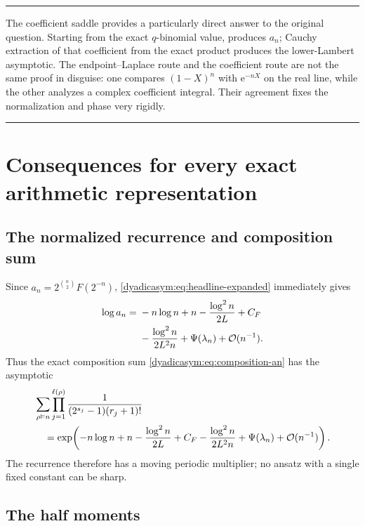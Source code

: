 \documentclass[11pt,oneside]{article}
\theoremstyle{definition}
\theoremstyle{remark}
\newcommand{\e}{\mathrm e}
\newcommand{\bigO}{\mathcal O}
\newenvironment{boxedremark}{%
  \par\smallskip\noindent\begin{center}\begin{minipage}{0.94\textwidth}%
  \color{black}\hrule\vspace{0.6em}\small
}{%
  \vspace{0.6em}\hrule\end{minipage}\end{center}\smallskip
}
\begin{document}
\begin{boxedremark}
The coefficient saddle provides a particularly direct answer to the original question.
Starting from the exact $q$-binomial value,  produces $a_n$; Cauchy
extraction of that coefficient from the exact product produces the lower-Lambert asymptotic.
The endpoint--Laplace route and the coefficient route are not the same proof in disguise:
one compares $(1-X)^n$ with $\e^{-nX}$ on the real line, while the other analyzes a complex
coefficient integral.  Their agreement fixes the normalization and phase very rigidly.
\end{boxedremark}

\section{Consequences for every exact arithmetic representation}
\label{dyadicasym:sec:corollaries}

\subsection{The normalized recurrence and composition sum}

Since $a_n=2^{\binom n2}F(2^{-n})$, \eqref{dyadicasym:eq:headline-expanded} immediately gives
\begin{align}
 \log a_n={}&-n\log n+n-\frac{\log^2n}{2L}+C_F             \notag\\
 &-\frac{\log^2n}{2L^2n}+\Psi(\lambda_n)+\bigO(n^{-1}).   \label{dyadicasym:eq:an-asymptotic}
\end{align}
Thus the exact composition sum \eqref{dyadicasym:eq:composition-an} has the asymptotic
\begin{align}
 &\sum_{\rho\vDash n}
 \prod_{j=1}^{\ell(\rho)}
 \frac{1}{(2^{s_j}-1)(r_j+1)!}                             \notag\\
 &\quad=\exp\!\left(
 -n\log n+n-\frac{\log^2n}{2L}+C_F
 -\frac{\log^2n}{2L^2n}+\Psi(\lambda_n)
 +\bigO(n^{-1})\right).                                    \label{dyadicasym:eq:composition-asymptotic}
\end{align}
The recurrence therefore has a moving periodic multiplier; no ansatz with a single fixed
constant can be sharp.

\subsection{The half moments}
\end{document}
